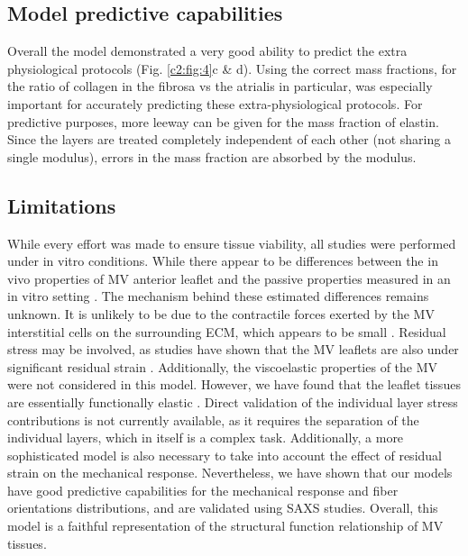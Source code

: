     
\subsection{Model predictive capabilities}

    Overall the model demonstrated a very good ability to predict the extra physiological protocols (Fig. \ref{c2:fig:4}c \& d). Using the correct mass fractions, for the ratio of collagen in the fibrosa vs the atrialis in particular, was especially important for accurately predicting these extra-physiological protocols. For predictive purposes, more leeway can be given for the mass fraction of elastin. Since the layers are treated completely independent of each other (not sharing a single modulus), errors in the mass fraction are absorbed by the modulus.
    
    
    
    
\subsection{Limitations}

    While every effort was made to ensure tissue viability, all studies were performed under in vitro conditions. While there appear to be differences between the in vivo properties of MV anterior leaflet \cite{krishnamurthy_material_2008} and the passive properties measured in an in vitro setting \cite{grashow_planar_2006,may-newman_biaxial_1995}. The mechanism behind these estimated differences remains unknown. It is unlikely to be due to the contractile forces exerted by the MV interstitial cells on the surrounding ECM, which appears to be small \cite{buchanan_interlayer_2013}. Residual stress may be involved, as studies have shown that the MV leaflets are also under significant residual strain \cite{amini_vivo_2012}. Additionally, the viscoelastic properties of the MV were not considered in this model. However, we have found that the leaflet tissues are essentially functionally elastic \cite{grashow_biaxial_2006,grashow_planar_2006}. Direct validation of the individual layer stress contributions is not currently available, as it requires the separation of the individual layers, which in itself is a complex task. Additionally, a more sophisticated model is also necessary to take into account the effect of residual strain on the mechanical response. Nevertheless, we have shown that our models have good predictive capabilities for the mechanical response and fiber orientations distributions, and are validated using SAXS studies. Overall, this model is a faithful representation of the structural function relationship of MV tissues.